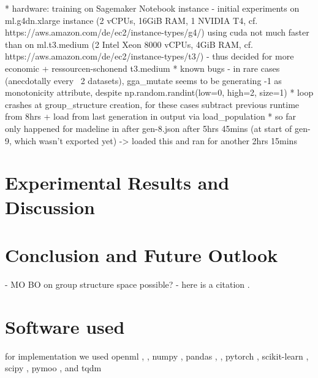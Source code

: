 \documentclass[twoside,11pt]{article}
\begin{document}
  * hardware: training on Sagemaker Notebook instance
    - initial experiments on ml.g4dn.xlarge instance (2 vCPUs, 16GiB RAM, 1 NVIDIA T4, cf. https://aws.amazon.com/de/ec2/instance-types/g4/)
    using cuda not much faster than on ml.t3.medium (2 Intel Xeon 8000 vCPUs, 4GiB RAM, cf. https://aws.amazon.com/de/ec2/instance-types/t3/)
    - thus decided for more economic + ressourcen-schonend t3.medium
  * known bugs
    - in rare cases (anecdotally every ~2 datasets), gga\_mutate seems to be generating -1 as monotonicity attribute, despite np.random.randint(low=0, high=2, size=1)
      * loop crashes at group\_structure creation, for these cases subtract previous runtime from 8hrs + load from last generation in output via load\_population
      * so far only happened for madeline in after gen-8.json after 5hrs 45mins (at start of gen-9, which wasn't exported yet) -> loaded this and ran for another 2hrs 15mins


\section{Experimental Results and Discussion}


\section{Conclusion and Future Outlook}
- MO BO on group structure space possible?
- here is a citation \cite{EAGGA}.


\newpage

\appendix
\section{Software used}
for implementation we used openml \cite{OpenML}, \cite{OpenMLPython}, numpy \cite{numpy}, pandas \cite{pandas1}, \cite{pandas2}, pytorch \cite{PyTorch},
scikit-learn \cite{scikit-learn}, scipy \cite{SciPy}, pymoo \cite{pymoo}, and tqdm \cite{tqdm}

\section{}
\label{app:theorem}

\end{document}
